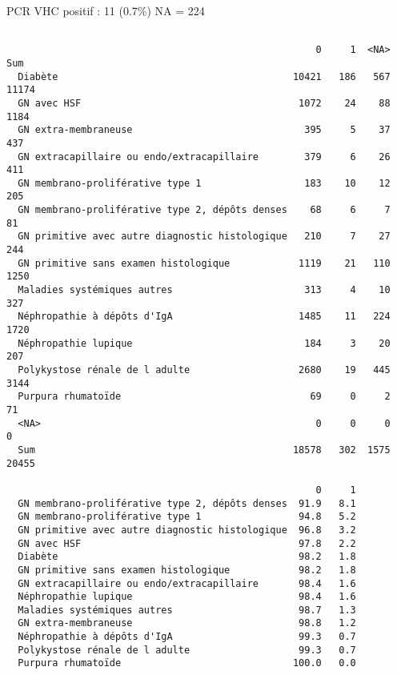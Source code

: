 \documentclass[11pt,a4paper]{article}\usepackage[]{graphicx}\usepackage[]{color}
\makeatletter
\newenvironment{kframe}{%
 \def\at@end@of@kframe{}%
 \ifinner\ifhmode%
  \def\at@end@of@kframe{\end{minipage}}%
  \begin{minipage}{\columnwidth}%
 \fi\fi%
 \def\FrameCommand##1{\hskip\@totalleftmargin \hskip-\fboxsep
 \colorbox{shadecolor}{##1}\hskip-\fboxsep
     \hskip-\linewidth \hskip-\@totalleftmargin \hskip\columnwidth}%
 \MakeFramed {\advance\hsize-\width
   \@totalleftmargin\z@ \linewidth\hsize
   \@setminipage}}%
 {\par\unskip\endMakeFramed%
 \at@end@of@kframe}
\newenvironment{knitrout}{}{} %
\makeatother
\begin{document}
PCR VHC positif : 11 (0.7\%) NA = 224
\begin{knitrout}
\color{fgcolor}\begin{kframe}
\begin{verbatim}
                                                 
                                                      0     1  <NA>   Sum
  Diabète                                         10421   186   567 11174
  GN avec HSF                                      1072    24    88  1184
  GN extra-membraneuse                              395     5    37   437
  GN extracapillaire ou endo/extracapillaire        379     6    26   411
  GN membrano-proliférative type 1                  183    10    12   205
  GN membrano-proliférative type 2, dépôts denses    68     6     7    81
  GN primitive avec autre diagnostic histologique   210     7    27   244
  GN primitive sans examen histologique            1119    21   110  1250
  Maladies systémiques autres                       313     4    10   327
  Néphropathie à dépôts d'IgA                      1485    11   224  1720
  Néphropathie lupique                              184     3    20   207
  Polykystose rénale de l adulte                   2680    19   445  3144
  Purpura rhumatoïde                                 69     0     2    71
  <NA>                                                0     0     0     0
  Sum                                             18578   302  1575 20455
                                                 
                                                      0     1
  GN membrano-proliférative type 2, dépôts denses  91.9   8.1
  GN membrano-proliférative type 1                 94.8   5.2
  GN primitive avec autre diagnostic histologique  96.8   3.2
  GN avec HSF                                      97.8   2.2
  Diabète                                          98.2   1.8
  GN primitive sans examen histologique            98.2   1.8
  GN extracapillaire ou endo/extracapillaire       98.4   1.6
  Néphropathie lupique                             98.4   1.6
  Maladies systémiques autres                      98.7   1.3
  GN extra-membraneuse                             98.8   1.2
  Néphropathie à dépôts d'IgA                      99.3   0.7
  Polykystose rénale de l adulte                   99.3   0.7
  Purpura rhumatoïde                              100.0   0.0
\end{verbatim}
\end{kframe}
\end{knitrout}
\end{document}
